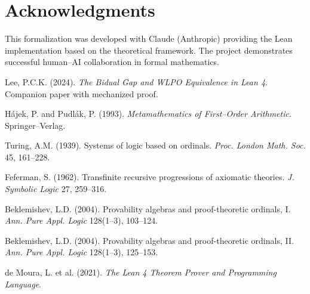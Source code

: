 \documentclass[11pt]{article}
\theoremstyle{definition}
\theoremstyle{remark}
\begin{document}
\section*{Acknowledgments}

This formalization was developed with Claude (Anthropic) providing the Lean implementation based on the theoretical framework. The project demonstrates successful human--AI collaboration in formal mathematics.

\begin{thebibliography}{10}

Lee, P.C.K. (2024). \emph{The Bidual Gap and WLPO Equivalence in Lean 4}. Companion paper with mechanized proof.

Hájek, P. and Pudlák, P. (1993). \emph{Metamathematics of First--Order Arithmetic}. Springer--Verlag.

Turing, A.M. (1939). Systems of logic based on ordinals. \emph{Proc. London Math. Soc.} 45, 161--228.

Feferman, S. (1962). Transfinite recursive progressions of axiomatic theories. \emph{J. Symbolic Logic} 27, 259--316.

Beklemishev, L.D. (2004). Provability algebras and proof-theoretic ordinals, {I}. \emph{Ann. Pure Appl. Logic} 128(1--3), 103--124.

Beklemishev, L.D. (2004). Provability algebras and proof-theoretic ordinals, {II}. \emph{Ann. Pure Appl. Logic} 128(1--3), 125--153.

de Moura, L. et al. (2021). \emph{The Lean 4 Theorem Prover and Programming Language}. 

\end{thebibliography}
\end{document}
